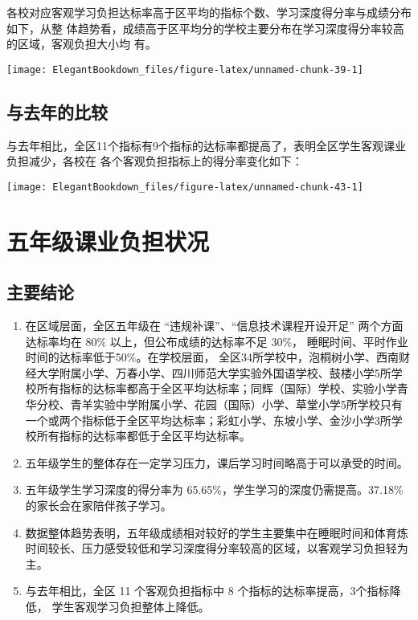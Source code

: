\documentclass[cn, 11pt, fancy, hide]{elegantbook}
\begin{document}
各校对应客观学习负担达标率高于区平均的指标个数、学习深度得分率与成绩分布如下，从整
体趋势看，成绩高于区平均分的学校主要分布在学习深度得分率较高的区域，客观负担大小均
有。

\begin{center}\texttt{[image: ElegantBookdown\_files/figure-latex/unnamed-chunk-39-1]} \end{center}

\hypertarget{section-13}{%
\section{与去年的比较}\label{section-13}}

与去年相比，全区11个指标有9个指标的达标率都提高了，表明全区学生客观课业负担减少，各校在
各个客观负担指标上的得分率变化如下：

\begin{center}\texttt{[image: ElegantBookdown\_files/figure-latex/unnamed-chunk-43-1]} \end{center}

\hypertarget{section-14}{%
\chapter{五年级课业负担状况}\label{section-14}}

\hypertarget{section-15}{%
\section{主要结论}\label{section-15}}

\begin{enumerate}
\def\labelenumi{\arabic{enumi}.}
\item
  在区域层面，全区五年级在 ``违规补课''、``信息技术课程开设开足'' 两个方面达标率均在 80\%
  以上，但公布成绩的达标率不足 30\%， 睡眠时间、平时作业时间的达标率低于50\%。在学校层面，
  全区34所学校中，泡桐树小学、西南财经大学附属小学、万春小学、四川师范大学实验外国语学校、鼓楼小学5所学校所有指标的达标率都高于全区平均达标率；同辉（国际）学校、实验小学青华分校、青羊实验中学附属小学、花园（国际）小学、草堂小学5所学校只有一个或两个指标低于全区平均达标率；彩虹小学、东坡小学、金沙小学3所学校所有指标的达标率都低于全区平均达标率。
\item
  五年级学生的整体存在一定学习压力，课后学习时间略高于可以承受的时间。
\item
  五年级学生学习深度的得分率为 65.65\%，学生学习的深度仍需提高。37.18\%
  的家长会在家陪伴孩子学习。
\item
  数据整体趋势表明，五年级成绩相对较好的学生主要集中在睡眠时间和体育炼
  时间较长、压力感受较低和学习深度得分率较高的区域，以客观学习负担轻为主。
\item
  与去年相比，全区 11 个客观负担指标中 8 个指标的达标率提高，3个指标降低，
  学生客观学习负担整体上降低。
\end{enumerate}
\end{document}
